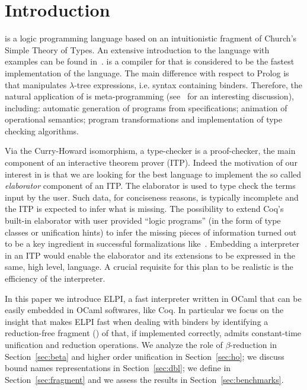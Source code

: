 \documentclass{llncs}
\begin{document}
\section{Introduction}%
\lp{} is a logic programming language based on an intuitionistic fragment of
Church's Simple Theory of Types. An extensive introduction to the language
with examples can be found in~\cite{Miller:2012:PHL:2331097}. \tedius{}
\cite{DBLP:conf/cade/NadathurM99,DBLP:journals/corr/abs-0911-5203} is a
compiler for \lp{} %
that is considered to be the fastest
implementation of the language. 
The main difference with respect to Prolog is that \lp{} manipulates
$\lambda$-tree expressions, i.e. syntax containing binders. Therefore, the
natural application of \lp{} is meta-programming (see~\cite{LPAZ} for
an interesting discussion), including: automatic generation of programs from
specifications; animation of operational semantics;
program transformations and implementation of type checking algorithms.

Via the Curry-Howard isomorphism, a type-checker is a proof-checker, the main
component of an interactive theorem prover (ITP). Indeed the motivation of our
interest in \lp{} is that we are looking for the best 
language to implement the so called \emph{elaborator} component of an ITP.
The elaborator is used to type check the terms input by
the user. Such data, for conciseness reasons, is typically incomplete and
the ITP is expected to infer what is missing. The possibility to
extend Coq's built-in elaborator with user provided ``logic programs'' (in the
form of type classes or unification hints) to infer the missing pieces of
information turned out to be a key ingredient in successful formalizations
like~\cite{gonthier:hal-00816699}. Embedding a \lp{} interpreter in an ITP
would enable the elaborator and its extensions to be expressed in the same,
high level, language. A crucial requisite for this plan to be realistic is
the efficiency of the \lp{} interpreter.

In this paper we introduce ELPI, a fast \lp{} interpreter written in OCaml
that can be easily embedded in OCaml softwares, like Coq.
In particular we focus on the insight that makes ELPI fast when dealing with
binders by identifying a reduction-free fragment (\rff{}) of \lp{} that, if
implemented correctly, admits constant-time unification and reduction
operations.
We analyze the role of $\beta$-reduction in Section~\ref{sec:beta} and
higher order unification in Section~\ref{sec:ho}; we discuss bound names
representations in Section~\ref{sec:dbl}; we define \rff{} 
in Section~\ref{sec:fragment} and we assess the results in
Section~\ref{sec:benchmarks}.
\end{document}

